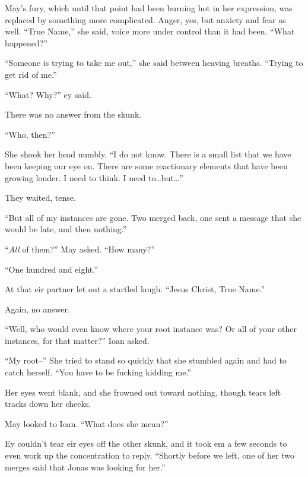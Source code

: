 May's fury, which until that point had been burning hot in her expression, was replaced by something more complicated. Anger, yes, but anxiety and fear as well. ``True Name,'' she said, voice more under control than it had been. ``What happened?''

``Someone is trying to take me out,'' she said between heaving breaths. ``Trying to get rid of me.''

``What? Why?'' ey said.

There was no answer from the skunk.

``Who, then?''

She shook her head numbly. ``I do not know. There is a small list that we have been keeping our eye on. There are some reactionary elements that have been growing louder. I need to think. I need to\ldots but\ldots{}''

They waited, tense.

``But all of my instances are gone. Two merged back, one sent a message that she would be late, and then nothing.''

``\emph{All} of them?'' May asked. ``How many?''

``One hundred and eight.''

At that eir partner let out a startled laugh. ``Jesus Christ, True Name.''

Again, no answer.

``Well, who would even know where your root instance was? Or all of your other instances, for that matter?'' Ioan asked.

``My root--'' She tried to stand so quickly that she stumbled again and had to catch herself. ``You have to be fucking kidding me.''

Her eyes went blank, and she frowned out toward nothing, though tears left tracks down her cheeks.

May looked to Ioan. ``What does she mean?''

Ey couldn't tear eir eyes off the other skunk, and it took em a few seconds to even work up the concentration to reply. ``Shortly before we left, one of her two merges said that Jonas was looking for her.''
